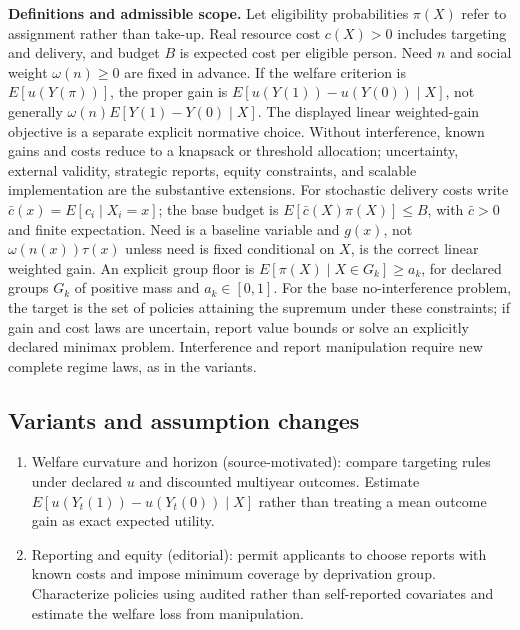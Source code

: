 \documentclass[11pt,a4paper]{article}
\begin{document}
\textbf{Definitions and admissible scope.} Let eligibility probabilities \(\pi(X)\) refer to assignment rather than take-up. Real resource cost \(c(X)>0\) includes targeting and delivery, and budget \(B\) is expected cost per eligible person. Need \(n\) and social weight \(\omega(n)\ge0\) are fixed in advance. If the welfare criterion is \(E[u(Y(\pi))]\), the proper gain is \(E[u(Y(1))-u(Y(0))\mid X]\), not generally \(\omega(n)E[Y(1)-Y(0)\mid X]\). The displayed linear weighted-gain objective is a separate explicit normative choice. Without interference, known gains and costs reduce to a knapsack or threshold allocation; uncertainty, external validity, strategic reports, equity constraints, and scalable implementation are the substantive extensions. For stochastic delivery costs write \(\bar c(x)=E[c_i\mid X_i=x]\); the base budget is \(E[\bar c(X)\pi(X)]\le B\), with \(\bar c>0\) and finite expectation. Need is a baseline variable and \(g(x)\), not \(\omega(n(x))\tau(x)\) unless need is fixed conditional on \(X\), is the correct linear weighted gain. An explicit group floor is \(E[\pi(X)\mid X\in G_k]\ge a_k\), for declared groups \(G_k\) of positive mass and \(a_k\in[0,1]\). For the base no-interference problem, the target is the set of policies attaining the supremum under these constraints; if gain and cost laws are uncertain, report value bounds or solve an explicitly declared minimax problem. Interference and report manipulation require new complete regime laws, as in the variants.
\subsection*{Variants and assumption changes}
\begin{enumerate}
\item Welfare curvature and horizon (source-motivated): compare targeting rules under declared \(u\) and discounted multiyear outcomes. Estimate \(E[u(Y_t(1))-u(Y_t(0))\mid X]\) rather than treating a mean outcome gain as exact expected utility.
\item Reporting and equity (editorial): permit applicants to choose reports with known costs and impose minimum coverage by deprivation group. Characterize policies using audited rather than self-reported covariates and estimate the welfare loss from manipulation.
\end{enumerate}
\end{document}
